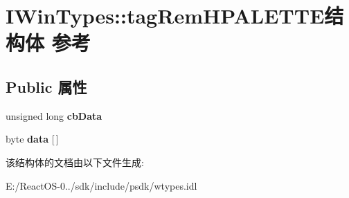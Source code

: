 \hypertarget{struct_i_win_types_1_1tag_rem_h_p_a_l_e_t_t_e}{}\section{I\+Win\+Types\+:\+:tag\+Rem\+H\+P\+A\+L\+E\+T\+T\+E结构体 参考}
\label{struct_i_win_types_1_1tag_rem_h_p_a_l_e_t_t_e}
\subsection*{Public 属性}
\begin{DoxyCompactItemize}
\item 
\mbox{\label{struct_i_win_types_1_1tag_rem_h_p_a_l_e_t_t_e_a45ca07b5f2815403197108c1ccfde431}} 
unsigned long {\bfseries cb\+Data}
\item 
\mbox{\label{struct_i_win_types_1_1tag_rem_h_p_a_l_e_t_t_e_a38a3a8509c2c3e870bc5d50cc5bc75e8}} 
byte {\bfseries data} \mbox{[}$\,$\mbox{]}
\end{DoxyCompactItemize}


该结构体的文档由以下文件生成\+:\begin{DoxyCompactItemize}
\item 
E\+:/\+React\+O\+S-\/0../sdk/include/psdk/wtypes.\+idl\end{DoxyCompactItemize}

